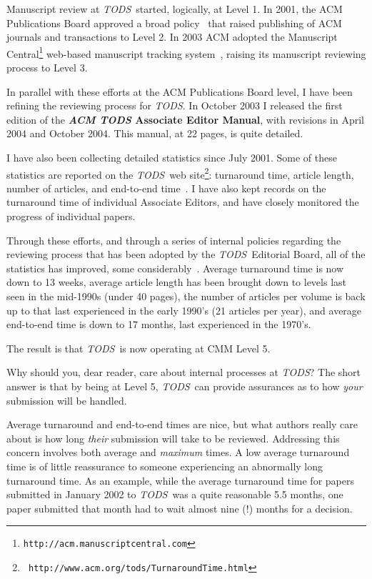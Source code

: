 \documentclass[11pt]{article}
\newcommand{\tods}{{\em TODS\/}}
\begin{document}
Manuscript review at \tods\ started, logically, at Level 1. In 2001, the ACM
Publications Board approved a broad
policy~\cite{ACMPubs,SnodgrassCACM,SnodgrassSIGMOD} that raised publishing
of ACM journals and transactions to Level 2. In 2003 ACM adopted the
Manuscript Central\footnote{\tt http://acm.manuscriptcentral.com} web-based
manuscript tracking system~\cite{SnodgrassMC}, raising its manuscript
reviewing process to Level 3.

In parallel with these efforts at the ACM Publications Board level, I have
been refining the reviewing process for \tods. In October 2003 I released
the first edition of the {\bf {\em ACM TODS} Associate Editor Manual}, with
revisions in April 2004 and October 2004. This manual, at 22 pages, is quite
detailed. 

I have also been collecting detailed statistics since
July 2001. Some of these statistics are
reported on the \tods\ web site\footnote{\tt
http://www.acm.org/tods/TurnaroundTime.html}: turnaround time, article
length, number of articles, and end-to-end time~\cite{SnodgrassSIGMOD}. I
have also kept records on the turnaround time of individual Associate
Editors, and have closely monitored the progress of individual papers.

Through these efforts, and through a series of internal policies regarding
the reviewing process that has been adopted by the \tods\ Editorial Board,
all of the statistics has improved, some
considerably~\cite{SnodgrassSept03}. Average turnaround time is now down to
13 weeks, average article length has been brought down to levels last seen
in the mid-1990s (under 40 pages), the number of articles per volume is back
up to that last experienced in the early 1990's (21 articles per year), and
average end-to-end time is down to 17 months, last experienced in the
1970's.

The result is that \tods\ is now operating at CMM Level 5.

Why should you, dear reader, care about internal processes at \tods?
The short answer is that by being at Level 5, \tods\ can provide assurances
as to how {\em your} submission will be handled.

Average turnaround and end-to-end times are nice, but what authors really
care about is how long {\em their} submission will take to be
reviewed. Addressing this concern involves both average and {\em maximum}
times. A low average turnaround time is of little reassurance to someone
experiencing an abnormally long turnaround time. As an example, while the
average turnaround time for papers submitted in January 2002 to \tods\ was a
quite reasonable 5.5 months, one paper submitted that month had to wait
almost nine (!) months for a decision.
\end{document}
